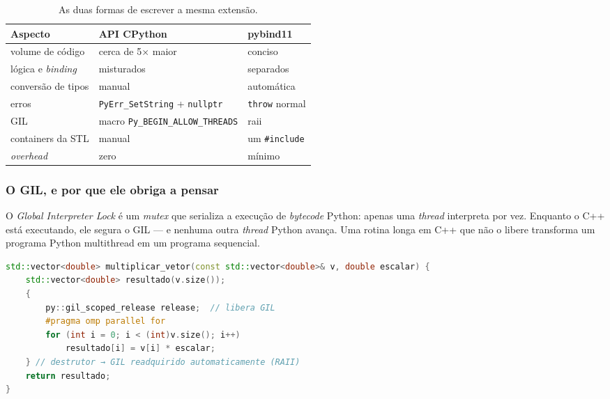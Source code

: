 \begin{table}[htbp]
\centering
\caption{As duas formas de escrever a mesma extensão.}
\label{tab:pybind-cpython}
\footnotesize
\begin{tabular}{@{}lll@{}}
\toprule
\textbf{Aspecto} & \textbf{API CPython} & \textbf{pybind11} \\
\midrule
volume de código      & cerca de 5$\times$ maior      & conciso \\
lógica e \emph{binding}& misturados                    & separados \\
conversão de tipos    & manual                        & automática \\
erros                 & \texttt{PyErr\_SetString} + \texttt{nullptr} & \texttt{throw} normal \\
GIL                   & macro \texttt{Py\_BEGIN\_ALLOW\_THREADS} & \gls{raii} \\
containers da STL     & manual                        & um \texttt{\#include} \\
\emph{overhead}       & zero                          & mínimo \\
\bottomrule
\end{tabular}
\end{table}

\subsubsection{O GIL, e por que ele obriga a pensar}

O \emph{Global Interpreter Lock} é um \emph{mutex} que serializa a execução de
\emph{bytecode} Python: apenas uma \emph{thread} interpreta por vez. Enquanto o
C++ está executando, ele segura o GIL --- e nenhuma outra \emph{thread} Python
avança. Uma rotina longa em C++ que não o libere transforma um programa Python
multithread em um programa sequencial.

\begin{lstlisting}[style=bt, language=C++,
    caption={Liberar o GIL durante o trabalho paralelo, e readquiri-lo pelo
             destrutor.}]
std::vector<double> multiplicar_vetor(const std::vector<double>& v, double escalar) {
    std::vector<double> resultado(v.size());
    {
        py::gil_scoped_release release;  // libera GIL
        #pragma omp parallel for
        for (int i = 0; i < (int)v.size(); i++)
            resultado[i] = v[i] * escalar;
    } // destrutor → GIL readquirido automaticamente (RAII)
    return resultado;
}
\end{lstlisting}

